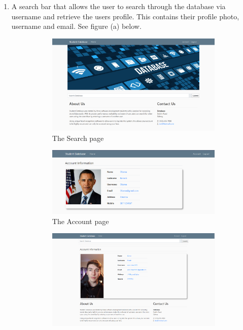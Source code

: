 \documentclass{article}
\begin{document}
\begin{enumerate}
    \newpage
    
    \item A search bar that allows the user to search through the database  via username and retrieve the users profile.
    This contains their profile photo, username and email. See figure (a) below.
    \begin{figure}[h!]
      \begin{subfigure}[b]{0.5\textwidth}
        \includegraphics[width=\textwidth]{images/SamplePictures/Search.png}
        \caption{The Search page}
        \label{fig:1}
      \end{subfigure}
      \begin{subfigure}[b]{0.6\textwidth}
        \includegraphics[width=\textwidth]{images/SamplePictures/Account.png}
        \caption{The Account page}
        \label{fig:2}
      \end{subfigure}
      \begin{subfigure}[b]{0.6\textwidth}
        \includegraphics[width=\textwidth]{images/SamplePictures/Conor.png}

\end{subfigure}
\end{figure}
\end{enumerate}
\end{document}
